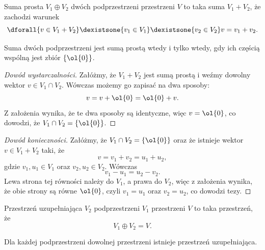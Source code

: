 \begin{definition}
    Suma prosta $V_1 \oplus V_2$ dwóch podprzestrzeni przestrzeni $V$ to taka suma $V_1 + V_2$, że zachodzi warunek
    \[ \dforall{v \in V_1 + V_2} \dexistsone{v_1 \in V_1} \dexistsone{v_2 \in V_2} v = v_1 + v_2. \]
\end{definition}

\begin{theorem}
    Suma dwóch podprzestrzeni jest sumą prostą wtedy i tylko wtedy, gdy ich częścią wspólną jest zbiór $\{\ol{0}\}$.
\end{theorem}
\begin{proof}[Dowód wystarczalności]
    Załóżmy, że $V_1 + V_2$ jest sumą prostą i weźmy dowolny wektor $v \in V_1 \cap V_2$. Wówczas możemy go zapisać na dwa sposoby:
    \[ v = v + \ol{0} = \ol{0} + v. \]
    Z założenia wynika, że te dwa sposoby są identyczne, więc $v = \ol{0}$, co dowodzi, że $V_1 \cap V_2 = \{\ol{0}\}$.
\end{proof}
\begin{proof}[Dowód konieczności]
    Załóżmy, że $V_1 \cap V_2 = \{\ol{0}\}$ oraz że istnieje wektor $v \in V_1 + V_2$ taki, że
    \[ v = v_1 + v_2 = u_1 + u_2, \]
    gdzie $v_1, u_1 \in V_1$ oraz $v_2, u_2 \in V_2$. Wówczas
    \[ v_1 - u_1 = u_2 - v_2. \]
    Lewa strona tej równości należy do $V_1$, a prawa do $V_2$, więc z założenia wynika, że obie strony są równe $\ol{0}$, czyli $v_1 = u_1$ oraz $v_2 = u_2$, co dowodzi tezy.
\end{proof}

\begin{definition}
    Przestrzeń uzupełniająca $V_2$ podprzestrzeni $V_1$ przestrzeni $V$ to taka przestrzeń, że
    \[ V_1 \oplus V_2 = V. \]
\end{definition}

\begin{fact}
    Dla każdej podprzestrzeni dowolnej przestrzeni istnieje przestrzeń uzupełniająca.
\end{fact}


